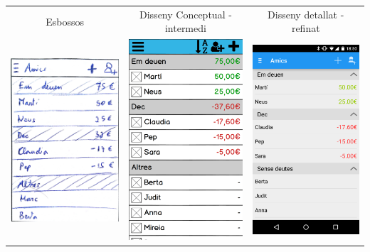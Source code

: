 \begin{table}
\begin{tabular}{| c | c | c |}
\hline
Esbossos & Disseny Conceptual - intermedi & Disseny detallat - refinat \\
\includegraphics[width=50mm]{1_People.jpg} &
\includegraphics[width=50mm]{2_People.png} &
\includegraphics[width=50mm]{3_People.png}  \\
\hline
\end{tabular}
\end{table}

